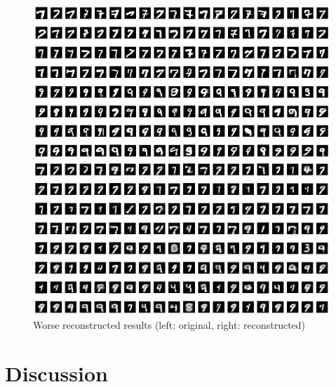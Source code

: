 \documentclass[12pt]{article}
\begin{document}
\begin{figure}[ht]
	\begin{minipage}[c]{0.5\linewidth}
	\includegraphics[scale=.25]{../res/testingOrigin7_9.png}
	\end{minipage}
	\begin{minipage}[c]{0.5\linewidth}
	\includegraphics[scale=.25]{../res/testingAvg7_9.png}
	\end{minipage}
	\caption{Worse reconstructed results (left: original, right: reconstructed)}
	\vspace{-3em}
\end{figure}

\newpage
\section*{Discussion}
\vspace{-20pt}
\noindent\makebox[\linewidth]{\rule{\textwidth}{0.4pt}}
\end{document}
